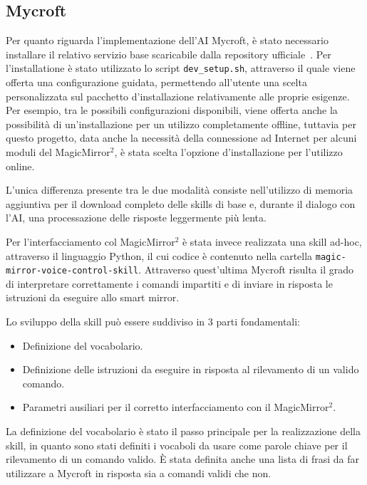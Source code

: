 \documentclass[12pt,a4paper]{article}
\begin{document}
\subsection{Mycroft}\label{mycroft}

Per quanto riguarda l'implementazione dell'AI Mycroft, \`e stato necessario installare il relativo
servizio base scaricabile dalla repository ufficiale~\cite{MycroftRepo}. Per l'installatione \`e stato
utilizzato lo script \verb|dev_setup.sh|, attraverso il quale viene offerta una configurazione guidata,
permettendo all'utente una scelta personalizzata sul pacchetto d'installazione relativamente alle proprie
esigenze. Per esempio, tra le possibili configurazioni disponibili, viene offerta anche la possibilit\`a di 
un'installazione per un utilizzo completamente offline, tuttavia per questo progetto, data anche la
necessit\`a della connessione ad Internet per alcuni moduli del MagicMirror$^2$, \`e stata scelta
l'opzione d'installazione per l'utilizzo online.

L'unica differenza presente tra le due modalit\`a consiste nell'utilizzo di memoria aggiuntiva per il download
completo delle skills di base e, durante il dialogo con l'AI, una processazione delle risposte leggermente
pi\`u lenta.

Per l'interfacciamento col MagicMirror$^2$ \`e stata invece realizzata una skill ad-hoc, attraverso il linguaggio
Python, il cui codice \`e contenuto nella cartella \verb|magic-mirror-voice-control-skill|. Attraverso quest'ultima
Mycroft risulta il grado di interpretare correttamente i comandi impartiti e di inviare in risposta le istruzioni
da eseguire allo smart mirror.

Lo sviluppo della skill pu\`o essere suddiviso in 3 parti fondamentali:
\begin{itemize}
  \item Definizione del vocabolario.
  \item Definizione delle istruzioni da eseguire in risposta al rilevamento di un valido comando.
  \item Parametri ausiliari per il corretto interfacciamento con il MagicMirror$^2$.
\end{itemize}

La definizione del vocabolario \`e stato il passo principale per la realizzazione della skill, in quanto sono
stati definiti i vocaboli da usare come parole chiave per il rilevamento di un comando valido. \`E stata
definita anche una lista di frasi da far utilizzare a Mycroft in risposta sia a comandi validi che non.
\end{document}
